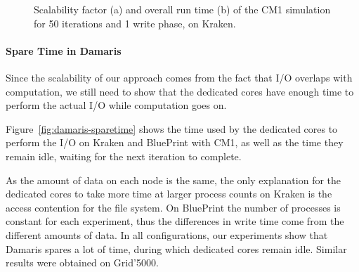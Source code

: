 \begin{figure}
	\begin{center}
	\quad
	\caption[Scalability and total run time of CM1 on Kraken]{Scalability factor (a) 
	and overall run time (b) of the CM1 simulation for 50 iterations and 1 write phase, on Kraken.}\label{fig:scalability}
	\end{center}
\end{figure}

\paragraph{Spare Time in Damaris}
Since the scalability of our approach comes from the fact that I/O overlaps with 
computation, we still need to show that the dedicated cores have enough time
to perform the actual I/O while computation goes on.

Figure~\ref{fig:damaris-sparetime} shows the time used by the dedicated cores
to perform the I/O on Kraken and BluePrint with CM1, as well as the time they remain idle,
waiting for the next iteration to complete.

As the amount of data on each node is the same, the only explanation for the 
dedicated cores to take more time at larger process counts on Kraken is the 
access contention for the file system.
On BluePrint the number of processes is constant for each experiment, 
thus the differences in write time come from the different amounts of data.
In all configurations, our experiments show that Damaris spares
a lot of time, during which dedicated cores remain idle. Similar results were obtained on Grid'5000.

